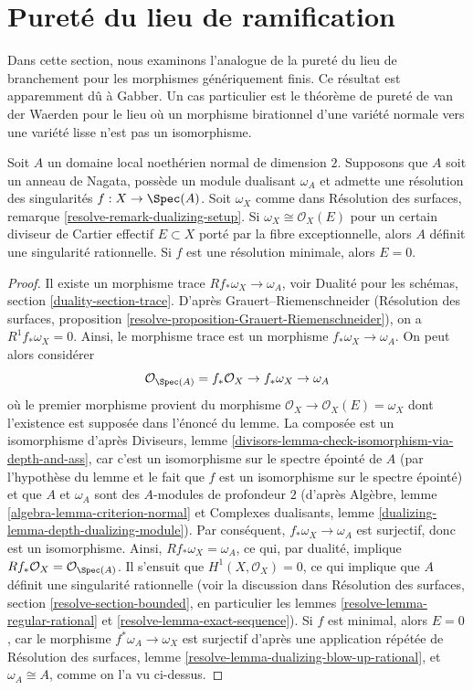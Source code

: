 \section{Pureté du lieu de ramification}
\label{section-purity-ramification}

\noindent
Dans cette section, nous examinons l'analogue de la pureté du lieu de branchement pour
les morphismes génériquement finis. Ce résultat est apparemment dû à Gabber.
Un cas particulier est le théorème de pureté de van der Waerden pour le lieu où
un morphisme birationnel d'une variété normale vers une variété lisse n'est pas
un isomorphisme.

\begin{lemma}
\label{lemma-characterize-rational-singularity}
Soit $A$ un domaine local noethérien normal de dimension $2$.
Supposons que $A$ soit un anneau de Nagata, possède un module dualisant $\omega_A$ et admette une
résolution des singularités $f : X \to \Spec(A)$.
Soit $\omega_X$ comme dans Résolution des surfaces,
remarque \ref{resolve-remark-dualizing-setup}.
Si $\omega_X \cong \mathcal{O}_X(E)$ pour un certain diviseur de
Cartier effectif $E \subset X$ porté par la fibre exceptionnelle,
alors $A$ définit une singularité rationnelle.
Si $f$ est une résolution minimale, alors $E = 0$.
\end{lemma}

\begin{proof}
Il existe un morphisme trace $Rf_*\omega_X \to \omega_A$, voir
Dualité pour les schémas, section \ref{duality-section-trace}.
D'après Grauert--Riemenschneider
(Résolution des surfaces,
proposition \ref{resolve-proposition-Grauert-Riemenschneider}),
on a $R^1f_*\omega_X = 0$.
Ainsi, le morphisme trace est un morphisme $f_*\omega_X \to \omega_A$.
On peut alors considérer
$$
\mathcal{O}_{\Spec(A)} = f_*\mathcal{O}_X \to f_*\omega_X \to \omega_A
$$
où le premier morphisme provient du morphisme
$\mathcal{O}_X \to \mathcal{O}_X(E) = \omega_X$ dont l'existence
est supposée dans l'énoncé du lemme.
La composée est un isomorphisme d'après Diviseurs, lemme
\ref{divisors-lemma-check-isomorphism-via-depth-and-ass},
car c'est un isomorphisme sur le spectre épointé de $A$
(par l'hypothèse du lemme et le fait que $f$ est un isomorphisme
sur le spectre épointé) et que $A$ et $\omega_A$
sont des $A$-modules de profondeur $2$ (d'après
Algèbre, lemme \ref{algebra-lemma-criterion-normal} et
Complexes dualisants, lemme \ref{dualizing-lemma-depth-dualizing-module}).
Par conséquent, $f_*\omega_X \to \omega_A$ est surjectif, donc est un isomorphisme.
Ainsi, $Rf_*\omega_X = \omega_A$, ce qui, par dualité, implique
$Rf_*\mathcal{O}_X = \mathcal{O}_{\Spec(A)}$.
Il s'ensuit que $H^1(X, \mathcal{O}_X) = 0$, ce qui implique que $A$
définit une singularité rationnelle (voir la discussion dans
Résolution des surfaces, section
\ref{resolve-section-bounded}, en particulier les
lemmes \ref{resolve-lemma-regular-rational} et
\ref{resolve-lemma-exact-sequence}).
Si $f$ est minimal, alors $E = 0$, car le morphisme
$f^*\omega_A \to \omega_X$ est surjectif d'après
une application répétée de Résolution des surfaces, lemme
\ref{resolve-lemma-dualizing-blow-up-rational},
et $\omega_A \cong A$, comme on l'a vu ci-dessus.
\end{proof}

